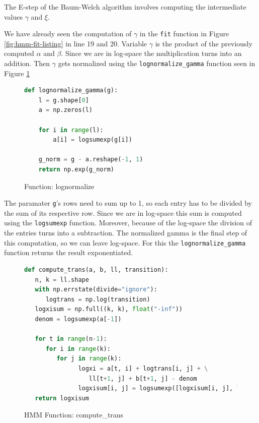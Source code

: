 The E-step of the Baum-Welch algorithm involves computing the intermediate values $\gamma$ and $\xi$. 

We have already seen the computation of $\gamma$ in the \texttt{fit} function in Figure \ref{fig:hmm-fit-listing} in line 19 and 20. Variable $\gamma$ is the product of the previously computed $\alpha$ and $\beta$. Since we are in log-space the multiplication turns into an addition. Then $\gamma$ gets normalized using the \texttt{lognormalize\_gamma} function seen in Figure \ref{fig:lognormalize-listing}

\begin{figure}
\begin{singlespace}
\begin{lstlisting}[language=Python]
   def lognormalize_gamma(g):
    l = g.shape[0]
    a = np.zeros(l)

    for i in range(l):
        a[i] = logsumexp(g[i])

    g_norm = g - a.reshape(-1, 1)
    return np.exp(g_norm)
\end{lstlisting}
\end{singlespace}
\caption{Function: lognormalize}    
\label{fig:lognormalize-listing}
\end{figure}

The paramater \texttt{g}'s rows need to sum up to 1, so each entry has to be divided by the sum of its respective row. Since we are in log-space this sum is computed using the \texttt{logsumexp} function. Moreover, because of the log-space the division of the entries turns into a subtraction. The normalized gamma is the final step of this computation, so we can leave log-space. For this the \texttt{lognormalize\_gamma} function returns the result exponentiated. 


\begin{figure}
\begin{singlespace}
\begin{lstlisting}[language=Python]
def compute_trans(a, b, ll, transition):
   n, k = ll.shape
   with np.errstate(divide="ignore"):
      logtrans = np.log(transition)
   logxisum = np.full((k, k), float("-inf"))
   denom = logsumexp(a[-1])

   for t in range(n-1):
      for i in range(k):
         for j in range(k):
               logxi = a[t, i] + logtrans[i, j] + \
                  ll[t+1, j] + b[t+1, j] - denom
               logxisum[i, j] = logsumexp([logxisum[i, j], logxi])
   return logxisum
\end{lstlisting}
\end{singlespace}
\caption{HMM Function: compute\_trans}    
\label{fig:hmm-computetrans-listing}
\end{figure}

